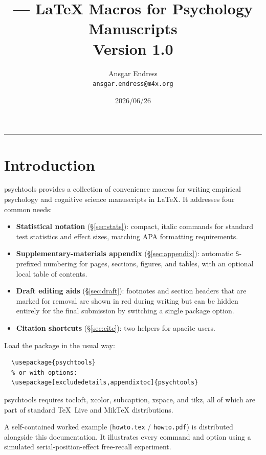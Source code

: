 \documentclass[a4paper,11pt]{article}
\title{\pkg{psychtools} --- LaTeX Macros for Psychology Manuscripts\\[0.5ex]
  \large Version 1.0}
\author{Ansgar Endress\\\texttt{ansgar.endress@m4x.org}}
\date{2026/06/26}
\newcommand{\pkg}[1]{\textsf{#1}}
\begin{document}
\maketitle
\tableofcontents
\bigskip\hrule\bigskip

\section{Introduction}

\pkg{psychtools} provides a collection of convenience macros for writing
empirical psychology and cognitive science manuscripts in \LaTeX. It addresses
four common needs:

\begin{itemize}
  \item \textbf{Statistical notation} (\S\ref{sec:stats}): compact, italic
        commands for standard test statistics and effect sizes, matching
        APA formatting requirements.
  \item \textbf{Supplementary-materials appendix} (\S\ref{sec:appendix}):
        automatic \texttt{S}-prefixed numbering for pages, sections, figures,
        and tables, with an optional local table of contents.
  \item \textbf{Draft editing aids} (\S\ref{sec:draft}): footnotes and
        section headers that are marked for removal are shown in red during
        writing but can be hidden entirely for the final submission by
        switching a single package option.
  \item \textbf{Citation shortcuts} (\S\ref{sec:cite}): two helpers for
        \pkg{apacite} users.
\end{itemize}

\noindent Load the package in the usual way:
\begin{verbatim}
  \usepackage{psychtools}
  % or with options:
  \usepackage[excludedetails,appendixtoc]{psychtools}
\end{verbatim}

\pkg{psychtools} requires \pkg{tocloft}, \pkg{xcolor}, \pkg{subcaption},
\pkg{xspace}, and \pkg{tikz}, all of which are part of standard \TeX~Live and
Mik\TeX{} distributions.

A self-contained worked example (\texttt{howto.tex} / \texttt{howto.pdf})
is distributed alongside this documentation. It illustrates every command
and option using a simulated serial-position-effect free-recall experiment.
\end{document}
